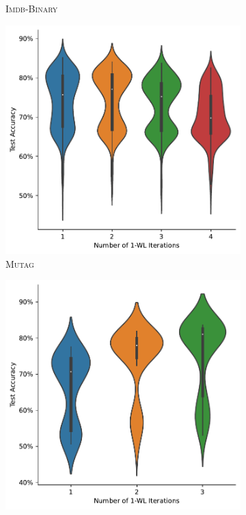 \begin{figure}
\begin{subfigure}[b]{0.19\textwidth}
        \caption{\scriptsize\textsc{Imdb-Binary}}
	\end{subfigure}
	\hfill
	\begin{subfigure}[b]{0.19\textwidth}
		\centering
		\includegraphics[width=\textwidth]{Figures/k_wl_violin_MUTAG.pdf}
        \caption{\scriptsize\textsc{Mutag}}
	\end{subfigure}
	\hfill
	\begin{subfigure}[b]{0.19\textwidth}
		\centering
		\includegraphics[width=\textwidth]{Figures/k_wl_violin_NCI1.pdf}

\end{subfigure}
\end{figure}
